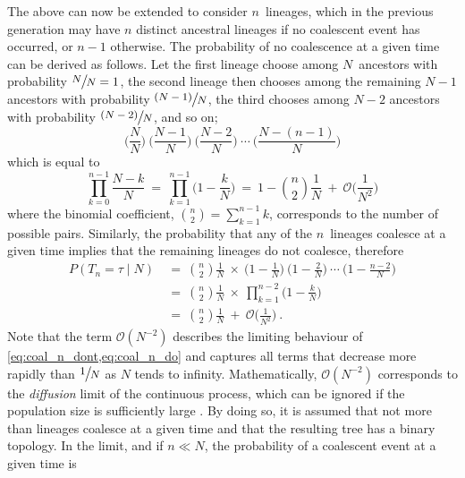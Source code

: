 The above can now be extended to consider $n$~lineages, which in the previous generation may have $n$ distinct ancestral lineages if no coalescent event has occurred, or ${n-1}$ otherwise.
The probability of no coalescence at a given time can be derived as follows.
Let the first lineage choose among $N$~ancestors with probability ${\large \sfrac{N}{N} = 1}$, the second lineage then chooses among the remaining ${N-1}$ ancestors with probability ${\large \sfrac{(N-1)}{N}}$, the third chooses among ${N-2}$ ancestors with probability ${\large \sfrac{(N-2)}{N}}$, and so on; \ie
\begin{equation*}
	\Big(\frac{N}{N}\Big) ~ \Big(\frac{N-1}{N}\Big) ~ \Big(\frac{N-2}{N}\Big) ~ \cdots ~ \Big(\frac{N-(n-1)}{N}\Big)
\end{equation*}
which is equal to
\begin{equation}\label{eq:coal_n_dont}
	\prod_{k=0}^{n-1} \frac{N-k}{N}
	~=~ \prod_{k=1}^{n-1} \Big( 1 - \frac{k}{N} \Big)
	~=~ 1 - {n \choose 2} \frac{1}{N} ~+~ \mathcal{O}\Big( \frac{1}{N^{2}} \Big)
\end{equation}
where the binomial coefficient, ${{n \choose 2} = \sum_{k=1}^{n-1}k}$, corresponds to the number of possible pairs.
Similarly, the probability that any  of the $n$~lineages coalesce at a given time implies that the remaining lineages do not coalesce, therefore
\begin{equation}\label{eq:coal_n_do}
\begin{split}
	P(T_n = \tau \mid N)
	& ~=~ {n \choose 2} \frac{1}{N} ~\times~ \Big(1-\frac{1}{N}\Big) ~ \Big(1-\frac{2}{N}\Big) ~ \cdots ~ \Big(1-\frac{n-2}{N}\Big) \\
	& ~=~ {n \choose 2} \frac{1}{N} ~\times~ \prod_{k=1}^{n-2} \Big( 1 - \frac{k}{N} \Big) \\
	& ~=~ {n \choose 2} \frac{1}{N} ~+~ \mathcal{O}\Big( \frac{1}{N^{2}} \Big)
	\ \text{.}
\end{split}
\end{equation}
Note that the term ${\mathcal{O}(N^{-2})}$ describes the limiting behaviour of \cref{eq:coal_n_dont,eq:coal_n_do} and captures all terms that decrease more rapidly than $\large \sfrac{1}{N}$ as $N$ tends to infinity.
Mathematically, ${\mathcal{O}(N^{-2})}$ corresponds to the \emph{diffusion} limit of the continuous process, which can be ignored if the population size is sufficiently large \citep[\eg, see][]{wakeley2008}.
By doing so, it is assumed that not more than  lineages coalesce at a given time and that the resulting tree has a binary topology.
In the limit, and if ${n \ll N}$, the probability of a coalescent event at a given time is
